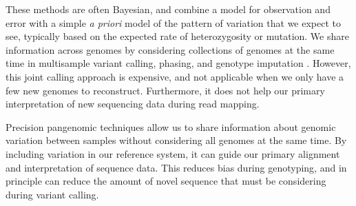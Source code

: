 These methods are often Bayesian, and combine a model for observation and error with a simple \emph{a priori} model of the pattern of variation that we expect to see, typically based on the expected rate of heterozygosity or mutation. %
We share information across genomes by considering collections of genomes at the same time in multisample variant calling, phasing, and genotype imputation \cite{1000_2015,browning2011haplotype}.
However, this joint calling approach is expensive, and not applicable when we only have a few new genomes to reconstruct.
Furthermore, it does not help our primary interpretation of new sequencing data during read mapping.

Precision pangenomic techniques allow us to share information about genomic variation between samples without considering all genomes at the same time.
By including variation in our reference system, it can guide our primary alignment and interpretation of sequence data.
This reduces bias during genotyping, and in principle can reduce the amount of novel sequence that must be considering during variant calling.




